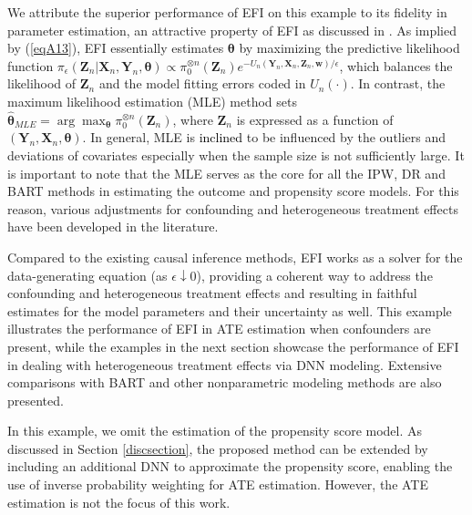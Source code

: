 \documentclass[11pt]{article}
\newcommand{\bX}{{\boldsymbol X}}
\newcommand{\bY}{{\boldsymbol Y}}
\newcommand{\bZ}{{\boldsymbol Z}}
\newcommand{\bw}{{\boldsymbol w}}
\newcommand{\btheta}{{\boldsymbol \theta}}
\begin{document}


We attribute the superior performance of EFI on this example 
to its fidelity in parameter estimation, an attractive property of EFI as discussed in \cite{LiangKS2024EFI}. As implied by (\ref{eqA13}), EFI 
essentially estimates $\btheta$ by maximizing the predictive likelihood function 
$\pi_{\epsilon}(\bZ_n|\bX_n,\bY_n,\btheta)\propto \pi_0^{\otimes n}(\bZ_n) e^{- 
U_n(\bY_n,\bX_n,\bZ_n, \bw)/\epsilon}$, which balances the likelihood of $\bZ_n$
and the model fitting errors coded in $U_n(\cdot)$. 
 In contrast, the maximum likelihood estimation (MLE) method sets $\hat{\btheta}_{MLE}= \arg\max_{\btheta}\pi_0^{\otimes n}(\bZ_n)$, where $\bZ_n$ is expressed as a  function of $(\bY_n,\bX_n,\btheta)$. In general, MLE is \textcolor{black}{inclined} to be influenced by the outliers and deviations of covariates especially when the sample size is not sufficiently large. 
 It is important to note that the MLE serves 
 as the core for all the IPW, DR and BART methods in estimating the outcome and propensity score models. For this reason, various adjustments for confounding and    
  heterogeneous treatment effects have been developed in the literature. 

Compared to the existing causal inference methods, EFI works as a solver for the data-generating equation (as $\epsilon \downarrow 0$), providing a coherent way to address the confounding and heterogeneous treatment 
effects and resulting in faithful estimates for the model parameters and their uncertainty as well.  
 This example illustrates the performance of EFI in ATE estimation when confounders are present, while the examples in the next section showcase the performance of EFI in 
dealing with heterogeneous treatment effects via DNN modeling. Extensive 
comparisons with BART and other nonparametric modeling methods are also presented. 

In this example, we omit the estimation of the propensity score model. As discussed in Section \ref{discsection}, the proposed method can be extended by including an additional DNN to approximate the propensity score, enabling the use of inverse probability weighting for ATE estimation. However, the ATE estimation is not the focus of this work. 

\end{document}
